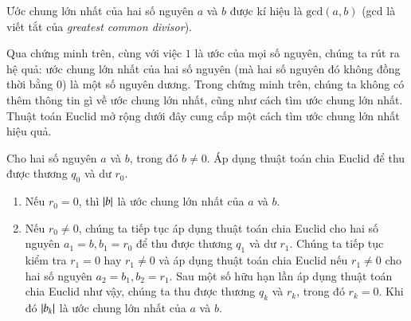 Ước chung lớn nhất của hai số nguyên $a$ và $b$ được kí hiệu là $\text{gcd}(a, b)$ (gcd là viết tắt của \textit{greatest common divisor}).

Qua chứng minh trên, cùng với việc $1$ là ước của mọi số nguyên, chúng ta rút ra hệ quả: ước chung lớn nhất của hai số nguyên (mà hai số nguyên đó không đồng thời bằng $0$) là một số nguyên dương. Trong chứng minh trên, chúng ta không có thêm thông tin gì về ước chung lớn nhất, cũng như cách tìm ước chung lớn nhất. Thuật toán Euclid mở rộng dưới đây cung cấp một cách tìm ước chung lớn nhất hiệu quả.

\begin{theorem}
    Cho hai số nguyên $a$ và $b$, trong đó $b\ne 0$. Áp dụng thuật toán chia Euclid để thu được thương $q_{0}$ và dư $r_{0}$.

    \begin{enumerate}[label={(\roman*)}]
        \item Nếu $r_{0} = 0$, thì $\left\vert{b}\right\vert$ là ước chung lớn nhất của $a$ và $b$.
        \item Nếu $r_{0}\ne 0$, chúng ta tiếp tục áp dụng thuật toán chia Euclid cho hai số nguyên $a_{1} = b, b_{1} = r_{0}$ để thu được thương $q_{1}$ và dư $r_{1}$. Chúng ta tiếp tục kiểm tra $r_{1} = 0$ hay $r_{1}\ne 0$ và áp dụng thuật toán chia Euclid nếu $r_{1}\ne 0$ cho hai số nguyên $a_{2} = b_{1}, b_{2} = r_{1}$. Sau một số hữu hạn lần áp dụng thuật toán chia Euclid như vậy, chúng ta thu được thương $q_{k}$ và $r_{k}$, trong đó $r_{k} = 0$. Khi đó $\left\vert{b_{k}}\right\vert$ là ước chung lớn nhất của $a$ và $b$.
    \end{enumerate}
\end{theorem}

